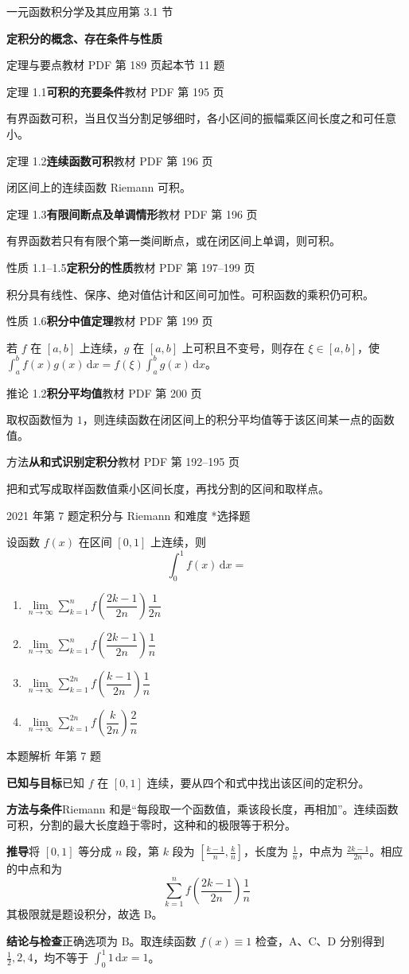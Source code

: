 \documentclass[UTF8,zihao=-4,fontset=fandol]{ctexart}
\renewcommand{\lim}{\operatorname*{lim}\limits}
\newcommand{\SectionHeading}[4]{%
  \clearpage\hypertarget{sec-#1}{}%
  {\small\textcolor{accent}{#2\hfill 第 #1 节}}\par\medskip
  {\LARGE\bfseries #3}\par\smallskip
  {\small\textcolor{muted}{#4}}\par\bigskip}
\newcommand{\Theory}[4]{%
  {\small\textcolor{accent}{#1}\quad\textbf{#3}\hfill\textcolor{muted}{教材 PDF 第 #2 页}}\par
  {\small #4}\par\smallskip}
\newenvironment{abcd}{\begin{enumerate}[label=\textup{(\Alph*)},leftmargin=2.3em,itemsep=1pt,topsep=4pt,parsep=1pt]}{\end{enumerate}}
\newcommand{\choices}[4]{%
  \begin{abcd}
    \item #1
    \item #2
    \item #3
    \item #4
  \end{abcd}}
\newcounter{BankQuestion}
\newcommand{\QuestionPage}[7]{%
  \stepcounter{BankQuestion}%
  \par\noindent\begin{minipage}{\linewidth}
  \raggedright
  {\small\textcolor{black!60}{#3\quad #5\quad 难度 #7}\hfill\textcolor{accent}{#2}}\par\smallskip}
\newcommand{\QuestionEnd}{\end{minipage}\par\medskip}
\newcommand{\QuestionPage}[7]{%
  \clearpage
  \stepcounter{BankQuestion}%
  {\small\textcolor{accent}{#1\hfill #2}}\par\medskip
  {\small\textcolor{black!60}{#3\quad #5\quad 难度 #7\hfill \arabic{BankQuestion} / 234}}\par\vspace{9bp}}
\newcommand{\QuestionEnd}{}
\newenvironment{QuestionSolution}[1]{%
  \clearpage
  {\small\textcolor{black!60}{本题解析\quad #1}}\par\medskip
}{\par\clearpage}
\begin{document}
\SectionHeading{3.1}{一元函数积分学及其应用}{定积分的概念、存在条件与性质}{定理与要点\quad 教材 PDF 第 189 页起\hfill 本节 11 题}
\Theory{定理 1.1}{195}{可积的充要条件}{有界函数可积，当且仅当分割足够细时，各小区间的振幅乘区间长度之和可任意小。}
\Theory{定理 1.2}{196}{连续函数可积}{闭区间上的连续函数 Riemann 可积。}
\Theory{定理 1.3}{196}{有限间断点及单调情形}{有界函数若只有有限个第一类间断点，或在闭区间上单调，则可积。}
\Theory{性质 1.1--1.5}{197--199}{定积分的性质}{积分具有线性、保序、绝对值估计和区间可加性。可积函数的乘积仍可积。}
\Theory{性质 1.6}{199}{积分中值定理}{若 \(f\) 在 \([a,b]\) 上连续，\(g\) 在 \([a,b]\) 上可积且不变号，则存在 \(\xi\in[a,b]\)，使 \(\int_a^b f(x)g(x)\,\mathrm{d}x=f(\xi)\int_a^b g(x)\,\mathrm{d}x\)。}
\Theory{推论 1.2}{200}{积分平均值}{取权函数恒为 \(1\)，则连续函数在闭区间上的积分平均值等于该区间某一点的函数值。}
\Theory{方法}{192--195}{从和式识别定积分}{把和式写成取样函数值乘小区间长度，再找分割的区间和取样点。}
\QuestionPage{3.1 定积分的概念、存在条件与性质}{选择题}{2021 年第 7 题}{1}{定积分与 Riemann 和}{132 / 234}{*}
设函数 \(f(x)\) 在区间 \(\left[0,1\right]\) 上连续，则
\[\int_{0}^{1} f(x)\,\mathrm{d}x=
\]
\choices{\(\lim_{n \to \infty}\sum_{k=1}^{n} f\left(\dfrac{2k-1}{2n}\right)\dfrac{1}{2n}\)}{\(\lim_{n \to \infty}\sum_{k=1}^{n} f\left(\dfrac{2k-1}{2n}\right)\dfrac{1}{n}\)}{\(\lim_{n \to \infty}\sum_{k=1}^{2n} f\left(\dfrac{k-1}{2n}\right)\dfrac{1}{n}\)}{\(\lim_{n \to \infty}\sum_{k=1}^{2n} f\left(\dfrac{k}{2n}\right)\dfrac{2}{n}\)}
\QuestionEnd

\begin{QuestionSolution}{2021 年第 7 题}
\textbf{已知与目标}\quad 已知 \(f\) 在 \([0,1]\) 连续，要从四个和式中找出该区间的定积分。

\textbf{方法与条件}\quad Riemann 和是“每段取一个函数值，乘该段长度，再相加”。连续函数可积，分割的最大长度趋于零时，这种和的极限等于积分。

\textbf{推导}\quad 将 \([0,1]\) 等分成 \(n\) 段，第 \(k\) 段为 \([\frac{k-1}{n},\frac{k}{n}]\)，长度为 \(\frac{1}{n}\)，中点为 \(\frac{2k-1}{2n}\)。相应的中点和为
\[
\sum_{k=1}^n f\!\left(\frac{2k-1}{2n}\right)\frac1n
\]
其极限就是题设积分，故选 B。

\textbf{结论与检查}\quad 正确选项为 \(\boxed{\mathrm{B}}\)。取连续函数 \(f(x)\equiv1\) 检查，A、C、D 分别得到 \(\frac{1}{2},2,4\)，均不等于 \(\int_0^1 1\,\mathrm{d}x=1\)。
\end{QuestionSolution}
\end{document}
